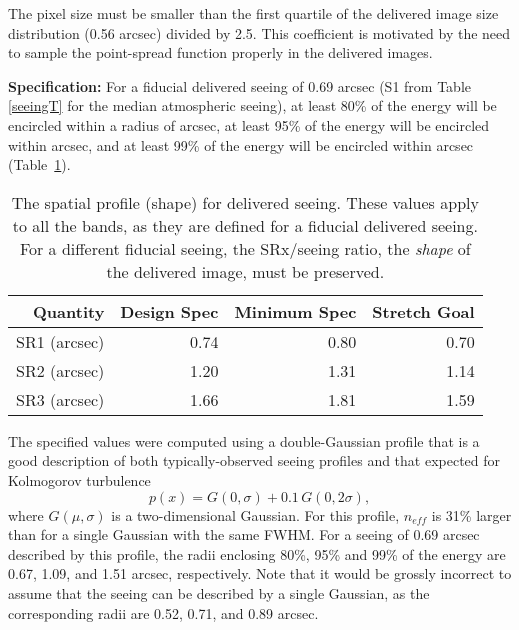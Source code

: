 The pixel size must be smaller than the first quartile of the delivered image
size distribution  (0.56 arcsec) divided by 2.5. This coefficient is motivated by the
need to sample the point-spread function properly in the delivered images.




\vskip 0.2in 

{\bf Specification:} For a fiducial delivered seeing of 0.69 arcsec
(S1 from Table \ref{seeingT} for the median atmospheric seeing), at least 80\%
of the energy will be encircled within a radius of
arcsec, at least 95\% of the energy will be encircled within
arcsec, and at least 99\% of the energy will be encircled within
arcsec
(Table~\ref{Tspatprof}).

\begin{table}[h]
\begin{tabular}{|r|r|r|r|}
\hline
       Quantity    & Design Spec & Minimum Spec & Stretch Goal \\
\hline
      SR1 (arcsec) &    0.74       &   0.80       &   0.70        \\
      SR2 (arcsec) &    1.20       &   1.31       &   1.14        \\
      SR3 (arcsec) &    1.66       &   1.81       &   1.59        \\
\hline
\end{tabular}
\caption{The spatial profile (shape) for delivered seeing. These values
  apply to all the bands, as they are defined for a
  fiducial delivered seeing. For a different fiducial seeing, the
  SRx/seeing ratio, \ie the {\it shape} of the delivered image,
  must be preserved.}
\label{Tspatprof}
\end{table}

The specified values were computed using a double-Gaussian profile that is
a good description of both typically-observed seeing profiles and that
expected for Kolmogorov turbulence
\begin{equation}
       p(x) = G(0,\sigma) + 0.1\, G(0,2\sigma),
\end{equation}
where $G(\mu,\sigma)$ is a two-dimensional Gaussian. For this profile,
$n_{eff}$ is 31\% larger than for a single Gaussian with the same FWHM. For
a seeing of 0.69 arcsec described by this profile, the radii enclosing
80\%, 95\% and 99\% of the energy are 0.67, 1.09, and 1.51 arcsec,
respectively. Note that it would be grossly incorrect to assume that the
seeing can be described by a single Gaussian, as the corresponding radii
are 0.52, 0.71, and 0.89 arcsec.

